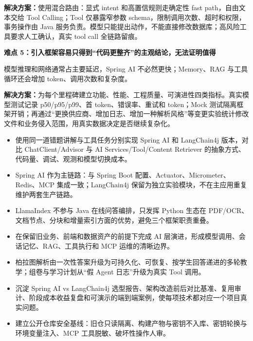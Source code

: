 \textbf{解决方案：}使用混合路由：显式 intent 和高置信规则走确定性 fast path，自由文本交给 Tool Calling；Tool 仅暴露窄参数 schema，限制调用次数、超时和权限，事务操作由 Java 服务负责。模型只能提出动作，不能直接修改数据库；高风险工具要求人工确认，真实 tool call 全链路留痕。

\vspace{0.5ex}
\textbf{难点 5：引入框架容易只得到“代码更整齐”的主观结论，无法证明值得}

模型推理和网络通常占主要延迟，Spring AI 不必然更快；Memory、RAG 与工具循环还会增加 token、调用次数和复杂度。

\textbf{解决方案：}为每个里程碑建立功能、性能、工程质量、可演进性四类指标。真实模型测试记录 p50/p95/p99、首 token、错误率、重试和 token；Mock 测试隔离框架开销；再通过“更换供应商、增加日志、增加一种解析风格”等变更实验统计修改文件和业务侵入范围，用真实数据决定是否继续复杂化。

\begin{itemize}[parsep=0.55ex]
  \item 使用同一道错题讲解与工具任务分别实现 Spring AI 和 LangChain4j 版本，对比 ChatClient/Advisor 与 AI Services/Tool/Content Retriever 的抽象方式、代码量、调试、观测和模型切换成本。
  \item Spring AI 作为主链路：与 Spring Boot 配置、Actuator、Micrometer、Redis、MCP 集成一致；LangChain4j 保留为独立实验模块，不在主应用重复维护两套生产链路。
  \item LlamaIndex 不参与 Java 在线问答编排，只发挥 Python 生态在 PDF/OCR、文档节点、分块和增量索引方面的优势，避免三个框架职责重叠。
\end{itemize}

\begin{itemize}[parsep=0.55ex]
  \item 在保留旧业务、前端和数据资产的前提下完成 AI 层演进，形成模型调用、会话记忆、RAG、工具执行和 MCP 运维的清晰边界。
  \item 柏拉图解析由一次性答案升级为可持久化、可恢复、按学生回答递进的多轮教学；组卷与学习计划从“假 Agent 日志”升级为真实 Tool 调用。
  \item 沉淀 Spring AI vs LangChain4j 选型报告、架构改造前后对比基准、复用审计、阶段成本收益复盘和可演示的端到端案例，使每项技术都对应一个项目真实问题。
  \item 建立公开仓库安全基线：旧仓只读隔离、构建产物与密钥不入库、密钥轮换与环境变量注入、MCP 工具脱敏、破坏性操作人审。
\end{itemize}

